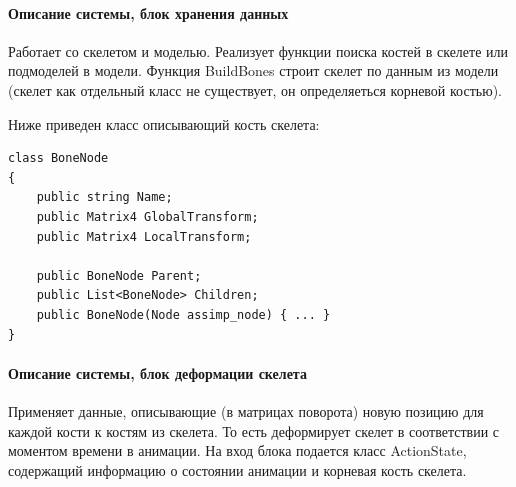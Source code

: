 \paragraph{Описание системы, блок хранения данных}
Работает со скелетом и моделью.
Реализует функции поиска костей в скелете или подмоделей в модели.
Функция BuildBones строит скелет по данным из модели (скелет как отдельный класс не существует, он определяеться корневой костью).

Ниже приведен класс описывающий кость скелета:
\begin{verbatim}
class BoneNode
{
    public string Name;
    public Matrix4 GlobalTransform;
    public Matrix4 LocalTransform;

    public BoneNode Parent;
    public List<BoneNode> Children;
    public BoneNode(Node assimp_node) { ... }
}
\end{verbatim}


\paragraph{Описание системы, блок деформации скелета}
Применяет данные, описывающие (в матрицах поворота) новую позицию для каждой кости к костям из скелета.
То есть деформирует скелет в соответствии с моментом времени в анимации. На вход блока подается класс ActionState, содержащий информацию о состоянии анимации и корневая кость скелета.

